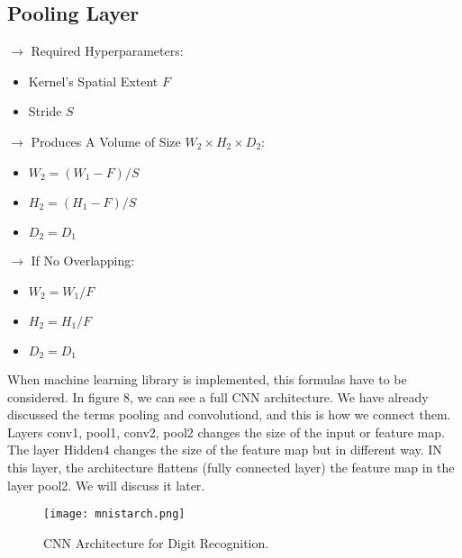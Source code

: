 \documentclass[11pt]{article}
\begin{document}
\subsection{Pooling Layer}$\rightarrow$ Required Hyperparameters:
\begin{itemize}
	\item Kernel's Spatial Extent $F$
	\item Stride $S$

\end{itemize}
$\rightarrow$ Produces A Volume of Size $W_2 \times H_2 \times D_2$:
\begin{itemize}
	\item $W_2 = (W_1 - F)/S$
	\item $H_2 = (H_1 - F)/S$
	\item $D_2 = D_1$
\end{itemize}
$\rightarrow$ If No Overlapping:
\begin{itemize}
	\item $W_2 = W_1/F$
	\item $H_2 = H_1/F$
	\item $D_2 = D_1$
\end{itemize}
When machine learning library is implemented, this formulas have to be considered. In figure 8, we can see a full CNN architecture. We have already discussed the terms pooling and convolutiond, and this is how we connect them. Layers conv1, pool1, conv2, pool2 changes the size of the input or feature map. The layer Hidden4 changes the size of the feature map but in different way. IN this layer, the architecture flattens (fully connected layer) the feature map in the layer pool2. We will discuss it later.
\begin{figure}[H]
\centering
\texttt{[image: mnistarch.png]}
\caption{CNN Architecture for Digit Recognition.}
\label{fig:figure3}
\end{figure}
\end{document}
